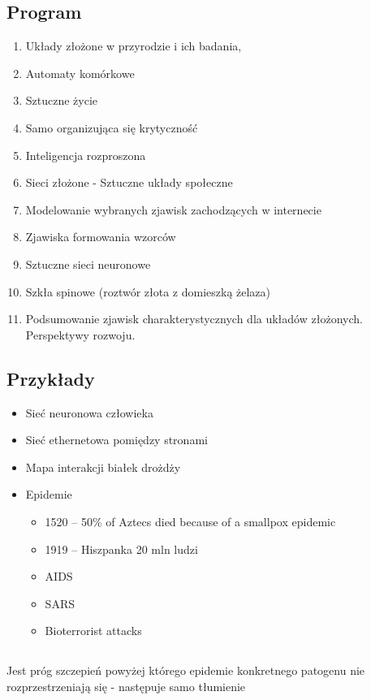 \documentclass[a4paper,10pt]{article}
\begin{document}
\subsection{Program}
\begin{enumerate}
\item Układy złożone w przyrodzie i ich badania,
\item Automaty komórkowe
\item Sztuczne życie
\item Samo organizująca się krytyczność
\item Inteligencja rozproszona
\item Sieci złożone - Sztuczne układy społeczne
\item Modelowanie wybranych zjawisk zachodzących w internecie
\item Zjawiska formowania wzorców
\item Sztuczne sieci neuronowe
\item Szkła spinowe (roztwór złota z domieszką żelaza)
\item Podsumowanie zjawisk charakterystycznych dla układów złożonych. Perspektywy rozwoju.
\end{enumerate}

\subsection{Przykłady}
\begin{itemize}
 \item Sieć neuronowa człowieka
 \item Sieć ethernetowa pomiędzy stronami
 \item Mapa interakcji białek drożdży
 \item Epidemie
 \begin{itemize}
  \item 1520 – 50\% of Aztecs died because of a smallpox epidemic
  \item 1919 – Hiszpanka 20 mln ludzi
  \item AIDS
  \item SARS
  \item Bioterrorist attacks
 \end{itemize}

\end{itemize}


\subsection{}
\paragraph{} Jest próg szczepień powyżej którego epidemie konkretnego patogenu nie rozprzestrzeniają się - następuje samo tłumienie
\end{document}
